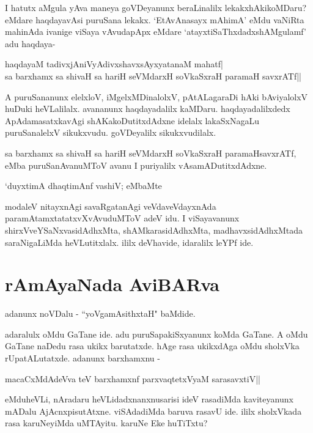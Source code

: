 I hatutx aMgula yAva maneya goVDeyanunx beraLinalilx lekakxhAkikoMDaru? eMdare haqdayavAsi puruSana lekakx. `EtAvAnasayx mAhimA'\label{249f} eMdu vaNiRta mahinAda ivanige viSaya vAvudapApx eMdare `atayxtiSaThxdadxshAMgulamf' adu haqdaya-

\begin{shloka}
haqdayaM tadivxjAniVyAdivxshavxsAyxyatanaM mahatf|\label{249e}\\
sa barxhamx sa shivaH sa hariH seVMdarxH soV\s kaSxraH paramaH savxrATf||\label{249c}
\end{shloka}

A puruSananunx elelxloV, iMgelxMDinalolxV, pAtALagaraDi hAki bAviyalolxV huDuki heVLalilalx. avananunx haqdayadalilx kaMDaru. haqdayadalilxdedx ApAdamasatxkavAgi shAKakoDutitxdAdxne idelalx lakaSxNagaLu puruSanalelxV sikukxvudu. goVDeyalilx sikukxvudilalx. 

sa barxhamx sa shivaH sa hariH seVMdarxH soVkaSxraH paramaHsavxrATf, eMba puruSanAvanuMToV avanu I puriyalilx vAsamADutitxdAdxne.

\begin{shloka}
`duyxtimA dhaqtimAnf vashiV; eMbaMte \label{249}
\end{shloka}

modaleV nitayxnAgi savaRgatanAgi veVdaveVdayxnAda paramAtamxtatatxvXvAvuduMToV adeV idu. I viSayavanunx shirxVveYSaNxvasidAdhxMta, shAMkarasidAdhxMta, madhavxsidAdhxMtada saraNigaLiMda heVLutitxlalx. ililx deVhavide, idaralilx leYPf ide. 

\section*{rAmAyaNada AviBARva}

\begin{shloka}
adanunx noVDalu - ``yoVgamAsithxtaH"\label{249b} baMdide.
\end{shloka}

adaralulx oMdu GaTane ide. adu puruSapakiSxyanunx koMda GaTane. A oMdu GaTane naDedu rasa ukikx barutatxde. hAge rasa ukikxdAga oMdu sholxVka rUpatALutatxde. adanunx barxhamxnu -

\begin{shloka}
macaCxMdAdeVva teV barxhamxnf  parxvaqtetxVyaM sarasavxtiV||\label{250c}
\end{shloka}

eMduheVLi, nAradaru heVLidadxnanxnusarisi ideV rasadiMda kaviteyanunx mADalu AjAcnxpisutAtxne. viSAdadiMda baruva rasavU ide. ililx sholxVkada rasa karuNeyiMda uMTAyitu. karuNe Eke huTiTxtu? 

